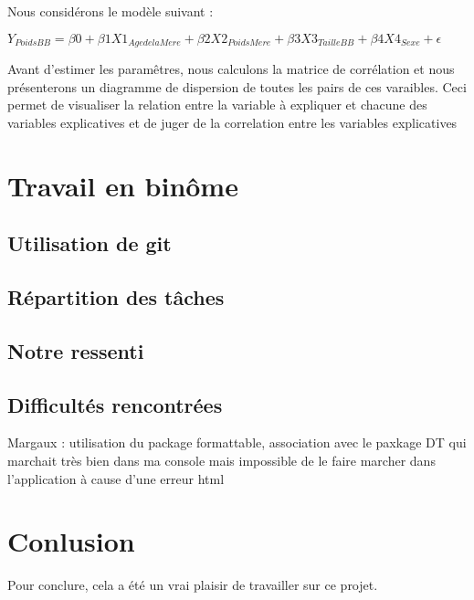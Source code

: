 \documentclass[
]{article}
\begin{document}
Nous considérons le modèle suivant :

\(Y_{PoidsBB} = \beta0 + \beta1 X1_{AgedelaMere} + \beta2 X2_{PoidsMere} + \beta3X3_{TailleBB} + \beta4X4_{Sexe} + \epsilon\)

Avant d'estimer les paramêtres, nous calculons la matrice de corrélation
et nous présenterons un diagramme de dispersion de toutes les pairs de
ces varaibles. Ceci permet de visualiser la relation entre la variable à
expliquer et chacune des variables explicatives et de juger de la
correlation entre les variables explicatives

\hypertarget{travail-en-binuxf4me}{%
\section{Travail en binôme}\label{travail-en-binuxf4me}}

\hypertarget{utilisation-de-git}{%
\subsection{Utilisation de git}\label{utilisation-de-git}}

\hypertarget{ruxe9partition-des-tuxe2ches}{%
\subsection{Répartition des tâches}\label{ruxe9partition-des-tuxe2ches}}

\hypertarget{notre-ressenti}{%
\subsection{Notre ressenti}\label{notre-ressenti}}

\hypertarget{difficultuxe9s-rencontruxe9es}{%
\subsection{Difficultés
rencontrées}\label{difficultuxe9s-rencontruxe9es}}

Margaux : utilisation du package formattable, association avec le
paxkage DT qui marchait très bien dans ma console mais impossible de le
faire marcher dans l'application à cause d'une erreur html

\hypertarget{conlusion}{%
\section{Conlusion}\label{conlusion}}

Pour conclure, cela a été un vrai plaisir de travailler sur ce projet.
\end{document}
